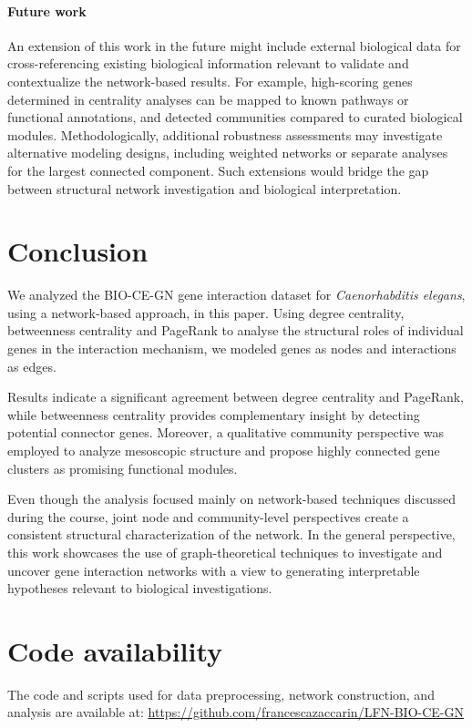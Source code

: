\paragraph{Future work}
An extension of this work in the future might include external biological data for cross-referencing existing biological information relevant to validate and contextualize the network-based results. For example, high-scoring genes determined in centrality analyses can be mapped to known pathways or functional annotations, and detected communities compared to curated biological modules. Methodologically, additional robustness assessments may investigate alternative modeling designs, including weighted networks or separate analyses for the largest connected component. Such extensions would bridge the gap between structural network investigation and biological interpretation.


\section{Conclusion}
We analyzed the BIO-CE-GN gene interaction dataset for \textit{Caenorhabditis elegans}, using a network-based approach, in this paper. Using degree centrality, betweenness centrality and PageRank to analyse the structural roles of individual genes in the interaction mechanism, we modeled genes as nodes and interactions as edges.

Results indicate a significant agreement between degree centrality and PageRank, while betweenness centrality provides complementary insight by detecting potential connector genes. Moreover, a qualitative community perspective was employed to analyze mesoscopic structure and propose highly connected gene clusters as promising functional modules.

Even though the analysis focused mainly on network-based techniques discussed during the course, joint node and community-level perspectives create a consistent structural characterization of the network. In the general perspective, this work showcases the use of graph-theoretical techniques to investigate and uncover gene interaction networks with a view to generating interpretable hypotheses relevant to biological investigations.

\section*{Code availability}
The code and scripts used for data preprocessing, network construction, and analysis are available at:
\url{https://github.com/francescazaccarin/LFN-BIO-CE-GN}
